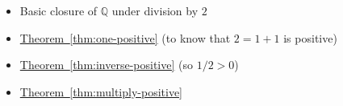 \begin{dependencies}
\begin{itemize}
  \item Basic closure of $\mathbb{Q}$ under division by $2$
  \item \hyperref[thm:one-positive]{Theorem~\ref*{thm:one-positive}}
        \textnormal{(to know that $2=1+1$ is positive)}
  \item \hyperref[thm:inverse-positive]{Theorem~\ref*{thm:inverse-positive}}
        \textnormal{(so $1/2>0$)}
  \item \hyperref[thm:multiply-positive]{Theorem~\ref*{thm:multiply-positive}}
\end{itemize}
\end{dependencies}

\clearpage
